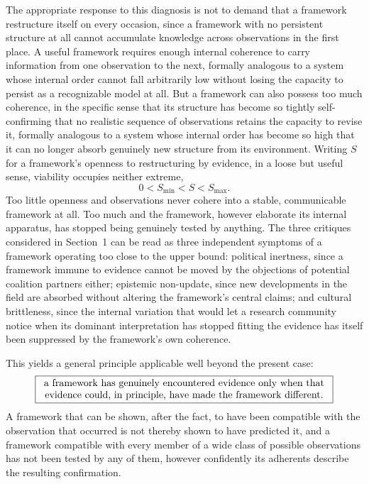 \documentclass[11pt]{article}
\begin{document}
The appropriate response to this diagnosis is not to demand that a framework restructure itself on every occasion, since a framework with no persistent structure at all cannot accumulate knowledge across observations in the first place. A useful framework requires enough internal coherence to carry information from one observation to the next, formally analogous to a system whose internal order cannot fall arbitrarily low without losing the capacity to persist as a recognizable model at all. But a framework can also possess too much coherence, in the specific sense that its structure has become so tightly self-confirming that no realistic sequence of observations retains the capacity to revise it, formally analogous to a system whose internal order has become so high that it can no longer absorb genuinely new structure from its environment. Writing $S$ for a framework's openness to restructuring by evidence, in a loose but useful sense, viability occupies neither extreme,
\[
0 < S_{\min} < S < S_{\max}.
\]
Too little openness and observations never cohere into a stable, communicable framework at all. Too much and the framework, however elaborate its internal apparatus, has stopped being genuinely tested by anything. The three critiques considered in Section~1 can be read as three independent symptoms of a framework operating too close to the upper bound: political inertness, since a framework immune to evidence cannot be moved by the objections of potential coalition partners either; epistemic non-update, since new developments in the field are absorbed without altering the framework's central claims; and cultural brittleness, since the internal variation that would let a research community notice when its dominant interpretation has stopped fitting the evidence has itself been suppressed by the framework's own coherence.

This yields a general principle applicable well beyond the present case:
\[
\boxed{\begin{minipage}{0.85\textwidth}\centering a framework has genuinely encountered evidence only when that evidence could, in principle, have made the framework different.\end{minipage}}
\]
A framework that can be shown, after the fact, to have been compatible with the observation that occurred is not thereby shown to have predicted it, and a framework compatible with every member of a wide class of possible observations has not been tested by any of them, however confidently its adherents describe the resulting confirmation.
\end{document}
